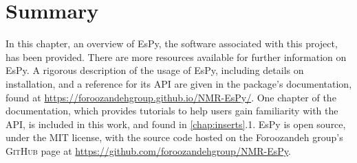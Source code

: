 \section{Summary}
In this chapter, an overview of \ac{EsPy}, the software associated with this project,
has been provided.
There are more resources available for further information on \ac{EsPy}. A rigorous
description of the usage of \ac{EsPy}, including details on installation, and a
reference for its \ac{API} are given in the package's documentation, found
at \url{https://foroozandehgroup.github.io/NMR-EsPy/}.
One chapter of the documentation, which provides tutorials to help users gain
familiarity with the \ac{API}, is included in this work, and found in
\cref{chap:inserts}.1.
\ac{EsPy} is open source, under the \textsc{MIT} license, with the source code
hosted on the Foroozandeh group's \textsc{GitHub} page at
\url{https://github.com/foroozandehgroup/NMR-EsPy}.
